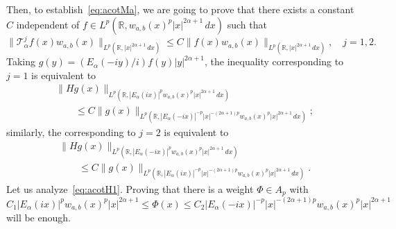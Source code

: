 \documentclass[a4paper]{amsart}
\theoremstyle{plain}
\theoremstyle{remark}
\newcommand{\R}{\mathbb{R}}
\newcommand{\Ta}{\mathcal{T}_\alpha} %
\begin{document}
Then, to establish~\eqref{eq:acotMa}, we are going to prove that there exists a constant $C$ independent of $f \in L^p(\R,w_{a,b}(x)^p|x|^{2\alpha+1}\,dx)$ such that
$$
  \| \Ta^j f(x) w_{a,b}(x) \|_{L^p(\R,|x|^{2\alpha+1}\,dx)}
  \le C \| f(x) w_{a,b}(x) \|_{L^p(\R,|x|^{2\alpha+1}\,dx)},
  \quad j=1,2.
$$
Taking $g(y) = (E_{\alpha}(-iy)/i) f(y) |y|^{2\alpha+1}$, the inequality corresponding to $j=1$ is equivalent to
\begin{equation}
\label{eq:acotH1}
\begin{aligned}
  &\| H g(x) \|_{L^p(\R, |E_{\alpha}(ix)|^p
    w_{a,b}(x)^p |x|^{2\alpha+1}\,dx)} \\
  &\qquad
  \le C \| g(x) \|_{L^p(\R, |E_{\alpha}(-ix)|^{-p} |x|^{-(2\alpha+1)p}
    w_{a,b}(x)^p |x|^{2\alpha+1}\,dx)};
\end{aligned}
\end{equation}
similarly, the corresponding to $j=2$ is equivalent to
\begin{equation}
\label{eq:acotH2}
\begin{aligned}
  &\| H g(x) \|_{L^p(\R, |E_{\alpha}(-ix)|^p
    w_{a,b}(x)^p |x|^{2\alpha+1}\,dx)} \\
  &\qquad
  \le C \| g(x) \|_{L^p(\R, |E_{\alpha}(ix)|^{-p} |x|^{-(2\alpha+1)p}
    w_{a,b}(x)^p |x|^{2\alpha+1}\,dx)}.
\end{aligned}
\end{equation}
Let us analyze~\eqref{eq:acotH1}. Proving that there is a weight $\Phi \in A_p$ with
\begin{equation*}
   C_1 |E_{\alpha}(ix)|^p w_{a,b}(x)^p |x|^{2\alpha+1}
   \le \Phi(x) \le
   C_2|E_{\alpha}(-ix)|^{-p} |x|^{-(2\alpha+1)p} w_{a,b}(x)^p |x|^{2\alpha+1}
\end{equation*}
will be enough.
\end{document}
